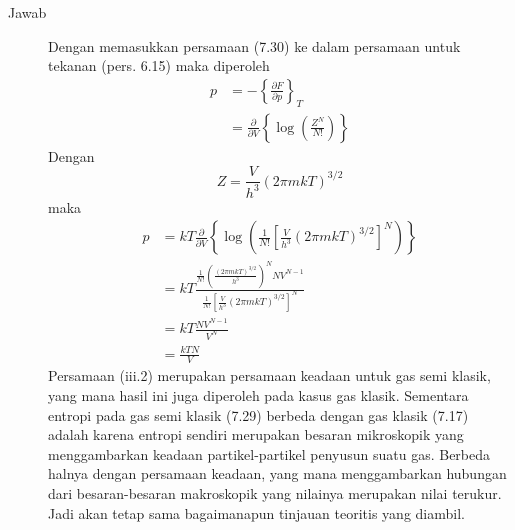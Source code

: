 \documentclass[a4paper , 12 pt]{article}
\begin{document}
\begin{enumerate}
\begin{description}
\item[Jawab]
	Dengan memasukkan persamaan (7.30) ke dalam persamaan untuk tekanan (pers. 6.15) maka diperoleh 
	\begin{align}
	 p   &= - \left \{  \frac{\partial F}{\partial p} \right \}_T \nonumber \\
	 & = \frac{\partial}{\partial V} \left \{ \log \left (  \frac{Z^N}{N !}\right ) \right \} \tag{iii.1}
	\end{align} 
	Dengan 
	\[
	Z = \frac{V}{h^3} (2 \pi m k T)^{3/2} 
	\]
	maka 
	\begin{align}
	p & = k T \frac{\partial}{\partial V} \left \{ \log \left ( \frac{1}{N !} \left[ \frac{V}{h^3} (2\pi mk T)^{3/2} \right ]^N \right ) \right \}  \nonumber \\
	& = kT  \frac{\frac{1}{N !} \left ( \frac{(2 \pi m k T)^{3/2}}{h^3} \right )^N N V^{N - 1} }{\frac{1}{N !} \left [ \frac{V}{h^3}  (2 \pi m k T)^{3/2} \right ]^N} \nonumber \\
	& = k T \frac{N V^{N -1}}{V^N} \nonumber \\
	& = \frac{k T N }{V}  \tag{iii.2}
	\end{align}
	Persamaan (iii.2) merupakan persamaan keadaan untuk gas semi klasik, yang mana hasil ini juga diperoleh pada kasus gas klasik. Sementara entropi pada gas semi klasik (7.29) berbeda dengan gas klasik (7.17) adalah karena entropi sendiri merupakan besaran mikroskopik yang menggambarkan keadaan partikel-partikel penyusun suatu gas. Berbeda halnya dengan  persamaan keadaan,  yang mana menggambarkan hubungan dari besaran-besaran makroskopik  yang nilainya merupakan nilai terukur. Jadi akan tetap sama bagaimanapun tinjauan teoritis yang diambil.
\end{description}
\end{enumerate}
\end{document}
